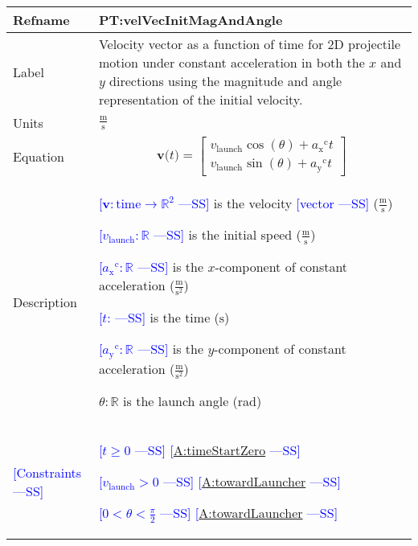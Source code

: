\documentclass[12pt]{article}
\newcommand{\authornote}[3]{\textcolor{#1}{[#3 ---#2]}}
\newcommand{\authornote}[3]{}
\newcommand{\wss}[1]{\authornote{blue}{SS}{#1}}
\begin{document}
\noindent
\begin{minipage}{\textwidth}
\begin{tabular}{>{\raggedright}p{}>{\raggedright\arraybackslash}p{}}
\toprule \textbf{Refname} & \textbf{PT:velVecInitMagAndAngle}
\label{PT:velVecInitMagAndAngle}
\\ \midrule
Label & Velocity vector as a function of time for 2D projectile motion under
constant acceleration in both the $x$ and $y$ directions using the magnitude and
angle representation of the initial velocity.
        
\\ \midrule
Units & $\frac{\text{m}}{\text{s}}$
        
\\ \midrule
Equation & \begin{displaymath}
           \symbf{v}\text{(}t\text{)}=\begin{bmatrix}
                                      {{v}_{\text{launch}}} \cos(\theta)+{{a_{\text{x}}}^{\text{c}}} t\\
                                      {{v}_{\text{launch}}} \sin(\theta)+{{a_{\text{y}}}^{\text{c}}} t
                                      \end{bmatrix}
           \end{displaymath}
\\ \midrule
Description & \begin{symbDescription}
              \item{\wss{$\symbf{v}: \text{time} \rightarrow \mathbb{R}^2$} is the velocity \wss{vector} ($\frac{\text{m}}{\text{s}}$)}
              \item{\wss{${{v}_{\text{launch}}}: \mathbb{R}$} is the initial speed ($\frac{\text{m}}{\text{s}}$)}
              \item{\wss{${{a_{\text{x}}}^{\text{c}}}: \mathbb{R}$} is the $x$-component of constant acceleration ($\frac{\text{m}}{\text{s}^{2}}$)}
              \item{\wss{$t$: \text{time}} is the time (${\text{s}}$)}
              \item{\wss{${{a_{\text{y}}}^{\text{c}}}: \mathbb{R}$} is the $y$-component of constant acceleration ($\frac{\text{m}}{\text{s}^{2}}$)}
              \item $\theta: \mathbb{R}$ is the launch angle (rad)
              \end{symbDescription}

\\ \midrule
\wss{Constraints} & 
\begin{symbDescription}
\item \wss{$t \geq 0$} \wss{\hyperref[timeStartZero]{A:timeStartZero}}
\item \wss{$v_\text{launch} > 0$} \wss{\hyperref[towardLauncher]{A:towardLauncher}}
\item \wss{$
0 < \theta < \frac{\pi}{2}$} \wss{\hyperref[towardLauncher]{A:towardLauncher}}
\end{symbDescription}


\end{tabular}
\end{minipage}
\end{document}
